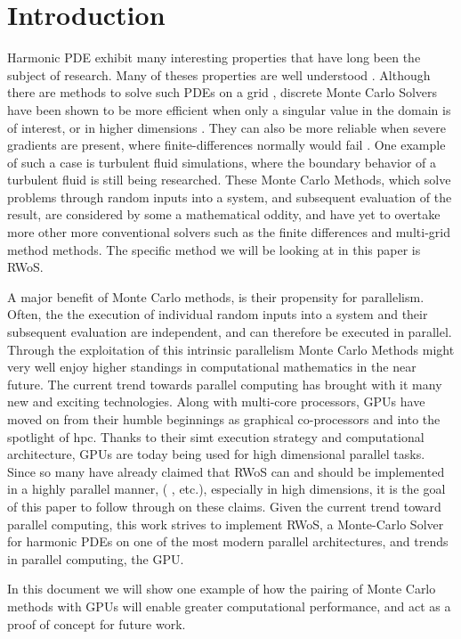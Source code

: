 
\chapter{Introduction}
\label{chapter:Introduction}


Harmonic \Gls{PDE} exhibit many interesting properties that
have long been the subject of research.    Many of theses properties are well
understood \cite{Axler1992,Sheldon}.  Although there are methods to solve such
\Glspl{PDE} on a grid \cite{Bornemann}, discrete Monte Carlo Solvers have been shown
to be more efficient when only a
singular value in the domain is of interest, or in higher dimensions
\cite{Bornemann, DeLaurentis, kakutani1944}.  They can also
be more reliable when severe gradients are present,
where finite-differences normally would fail \cite{DeLaurentis}. One example of such a case is
 turbulent fluid simulations, where the boundary behavior of a turbulent
fluid is still being researched.  These Monte Carlo Methods, which solve problems
through random inputs into a system, and subsequent evaluation of the result,
are considered by some a mathematical oddity, and have yet
to overtake more other more conventional solvers such as the finite differences and multi-grid method
methods.  The specific method we will be looking at in this paper is \Gls{RWoS}.
\par
A major benefit of Monte Carlo methods, is their propensity for parallelism.  Often,
the the execution of individual random inputs into a system  and their subsequent evaluation
are independent, and can therefore be executed in parallel.  Through the exploitation of this
intrinsic parallelism Monte Carlo Methods might very well enjoy higher standings
in computational mathematics in the near future.
The current trend towards parallel computing has brought with it many new and exciting
technologies.  Along with multi-core processors, \Glspl{GPU} have moved on from
their humble beginnings as graphical co-processors and into the spotlight of \gls{hpc}.  Thanks to their
\Gls{simt} execution strategy and computational architecture, \Glspl{GPU} are today being used for
high dimensional parallel tasks. Since so many have already
claimed that \Gls{RWoS} can and should be implemented in a highly parallel manner,
( \cite{DeLaurentis,Sabelfeld}, etc.), especially in high dimensions,  it is the goal
 of this paper to follow through on these claims.  Given the
current trend toward parallel computing, this work strives to implement
\Gls{RWoS}, a Monte-Carlo Solver for harmonic \Glspl{PDE} on one of the most modern
parallel architectures, and trends in parallel computing, the \Gls{GPU}.
\par
In this document we will show
one example of how the pairing of Monte Carlo methods with \Glspl{GPU} will enable
greater computational performance, and act as a proof of concept for future work.



